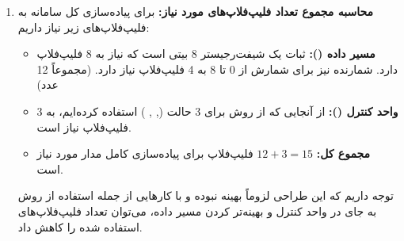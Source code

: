 \begin{enumerate}
    \item \textbf{محاسبه مجموع تعداد فلیپ‌فلاپ‌های مورد نیاز:}
          برای پیاده‌سازی کل سامانه به فلیپ‌فلاپ‌های زیر نیاز داریم:
          \begin{itemize}
              \item \textbf{مسیر داده ():} ثبات  یک شیفت‌رجیستر 8 بیتی است که نیاز به 8 فلیپ‌فلاپ دارد. شمارنده  نیز برای شمارش از 0 تا 8 به 4 فلیپ‌فلاپ نیاز دارد. (مجموعاً 12 عدد)
              \item \textbf{واحد کنترل ():} از آنجایی که از روش  برای 3 حالت (, , ) استفاده کرده‌ایم، به 3 فلیپ‌فلاپ نیاز است.
              \item \textbf{مجموع کل:} $12 + 3 = 15$ فلیپ‌فلاپ برای پیاده‌سازی کامل مدار مورد نیاز است.
          \end{itemize}
          توجه داریم که این طراحی لزوماً بهینه نبوده و با کارهایی از جمله استفاده از روش  به جای  در واحد کنترل و بهینه‌تر کردن مسیر داده، می‌توان تعداد فلیپ‌فلاپ‌های استفاده شده را کاهش داد.
\end{enumerate}
